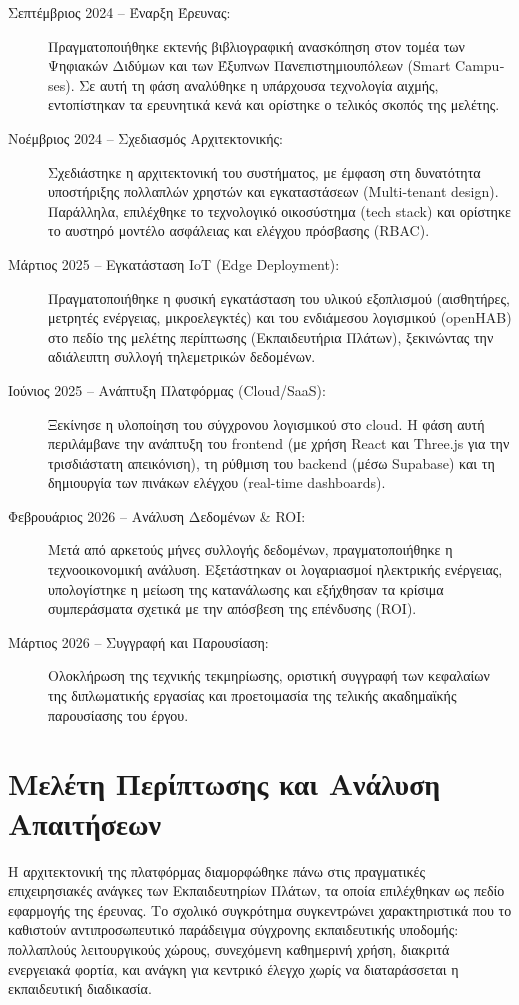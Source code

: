 \begin{description}
\item[Σεπτέμβριος 2024 -- Έναρξη Έρευνας:] Πραγματοποιήθηκε εκτενής βιβλιογραφική ανασκόπηση στον τομέα των Ψηφιακών Διδύμων και των Έξυπνων Πανεπιστημιουπόλεων (\textlatin{Smart Campuses}). Σε αυτή τη φάση αναλύθηκε η υπάρχουσα τεχνολογία αιχμής, εντοπίστηκαν τα ερευνητικά κενά και ορίστηκε ο τελικός σκοπός της μελέτης.
\item[Νοέμβριος 2024 -- Σχεδιασμός Αρχιτεκτονικής:] Σχεδιάστηκε η αρχιτεκτονική του συστήματος, με έμφαση στη δυνατότητα υποστήριξης πολλαπλών χρηστών και εγκαταστάσεων (\textlatin{Multi-tenant design}). Παράλληλα, επιλέχθηκε το τεχνολογικό οικοσύστημα (\textlatin{tech stack}) και ορίστηκε το αυστηρό μοντέλο ασφάλειας και ελέγχου πρόσβασης (\textlatin{RBAC}).
\item[Μάρτιος 2025 -- Εγκατάσταση IoT (Edge Deployment):] Πραγματοποιήθηκε η φυσική εγκατάσταση του υλικού εξοπλισμού (αισθητήρες, μετρητές ενέργειας, μικροελεγκτές) και του ενδιάμεσου λογισμικού (\textlatin{openHAB}) στο πεδίο της μελέτης περίπτωσης (Εκπαιδευτήρια Πλάτων), ξεκινώντας την αδιάλειπτη συλλογή τηλεμετρικών δεδομένων.
\item[Ιούνιος 2025 -- Ανάπτυξη Πλατφόρμας (Cloud/SaaS):] Ξεκίνησε η υλοποίηση του σύγχρονου λογισμικού στο \textlatin{cloud}. Η φάση αυτή περιλάμβανε την ανάπτυξη του \textlatin{frontend} (με χρήση \textlatin{React} και \textlatin{Three.js} για την τρισδιάστατη απεικόνιση), τη ρύθμιση του \textlatin{backend} (μέσω \textlatin{Supabase}) και τη δημιουργία των πινάκων ελέγχου (\textlatin{real-time dashboards}).
\item[Φεβρουάριος 2026 -- Ανάλυση Δεδομένων \& ROI:] Μετά από αρκετούς μήνες συλλογής δεδομένων, πραγματοποιήθηκε η τεχνοοικονομική ανάλυση. Εξετάστηκαν οι λογαριασμοί ηλεκτρικής ενέργειας, υπολογίστηκε η μείωση της κατανάλωσης και εξήχθησαν τα κρίσιμα συμπεράσματα σχετικά με την απόσβεση της επένδυσης (\textlatin{ROI}).
\item[Μάρτιος 2026 -- Συγγραφή και Παρουσίαση:] Ολοκλήρωση της τεχνικής τεκμηρίωσης, οριστική συγγραφή των κεφαλαίων της διπλωματικής εργασίας και προετοιμασία της τελικής ακαδημαϊκής παρουσίασης του έργου.
\end{description}

\section{Μελέτη Περίπτωσης και Ανάλυση Απαιτήσεων}
Η αρχιτεκτονική της πλατφόρμας διαμορφώθηκε πάνω στις πραγματικές επιχειρησιακές ανάγκες των Εκπαιδευτηρίων Πλάτων, τα οποία επιλέχθηκαν ως πεδίο εφαρμογής της έρευνας. Το σχολικό συγκρότημα συγκεντρώνει χαρακτηριστικά που το καθιστούν αντιπροσωπευτικό παράδειγμα σύγχρονης εκπαιδευτικής υποδομής: πολλαπλούς λειτουργικούς χώρους, συνεχόμενη καθημερινή χρήση, διακριτά ενεργειακά φορτία, και ανάγκη για κεντρικό έλεγχο χωρίς να διαταράσσεται η εκπαιδευτική διαδικασία.

